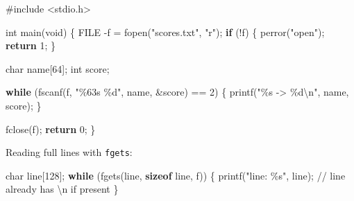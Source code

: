 \documentclass[
  letterpaper,
  DIV=11,
  numbers=noendperiod]{scrreprt}
\newenvironment{Shaded}{\begin{snugshade}}{\end{snugshade}}
\newcommand{\CommentTok}[1]{\textcolor[rgb]{0.37,0.37,0.37}{#1}}
\newcommand{\ControlFlowTok}[1]{\textcolor[rgb]{0.00,0.23,0.31}{\textbf{#1}}}
\newcommand{\DataTypeTok}[1]{\textcolor[rgb]{0.68,0.00,0.00}{#1}}
\newcommand{\DecValTok}[1]{\textcolor[rgb]{0.68,0.00,0.00}{#1}}
\newcommand{\ImportTok}[1]{\textcolor[rgb]{0.00,0.46,0.62}{#1}}
\newcommand{\KeywordTok}[1]{\textcolor[rgb]{0.00,0.23,0.31}{\textbf{#1}}}
\newcommand{\NormalTok}[1]{\textcolor[rgb]{0.00,0.23,0.31}{#1}}
\newcommand{\OperatorTok}[1]{\textcolor[rgb]{0.37,0.37,0.37}{#1}}
\newcommand{\PreprocessorTok}[1]{\textcolor[rgb]{0.68,0.00,0.00}{#1}}
\newcommand{\SpecialCharTok}[1]{\textcolor[rgb]{0.37,0.37,0.37}{#1}}
\newcommand{\StringTok}[1]{\textcolor[rgb]{0.13,0.47,0.30}{#1}}
\begin{document}
\begin{Shaded}
\begin{Highlighting}[]
\PreprocessorTok{\#include }\ImportTok{\textless{}stdio.h\textgreater{}}

\DataTypeTok{int}\NormalTok{ main}\OperatorTok{(}\DataTypeTok{void}\OperatorTok{)} \OperatorTok{\{}
    \DataTypeTok{FILE} \OperatorTok{{-}}\NormalTok{f }\OperatorTok{=}\NormalTok{ fopen}\OperatorTok{(}\StringTok{"scores.txt"}\OperatorTok{,} \StringTok{"r"}\OperatorTok{);}
    \ControlFlowTok{if} \OperatorTok{(!}\NormalTok{f}\OperatorTok{)} \OperatorTok{\{}\NormalTok{ perror}\OperatorTok{(}\StringTok{"open"}\OperatorTok{);} \ControlFlowTok{return} \DecValTok{1}\OperatorTok{;} \OperatorTok{\}}

    \DataTypeTok{char}\NormalTok{ name}\OperatorTok{[}\DecValTok{64}\OperatorTok{];}
    \DataTypeTok{int}\NormalTok{ score}\OperatorTok{;}

    \ControlFlowTok{while} \OperatorTok{(}\NormalTok{fscanf}\OperatorTok{(}\NormalTok{f}\OperatorTok{,} \StringTok{"}\SpecialCharTok{\%63s}\StringTok{ }\SpecialCharTok{\%d}\StringTok{"}\OperatorTok{,}\NormalTok{ name}\OperatorTok{,} \OperatorTok{\&}\NormalTok{score}\OperatorTok{)} \OperatorTok{==} \DecValTok{2}\OperatorTok{)} \OperatorTok{\{}
\NormalTok{        printf}\OperatorTok{(}\StringTok{"}\SpecialCharTok{\%s}\StringTok{ {-}\textgreater{} }\SpecialCharTok{\%d\textbackslash{}n}\StringTok{"}\OperatorTok{,}\NormalTok{ name}\OperatorTok{,}\NormalTok{ score}\OperatorTok{);}
    \OperatorTok{\}}

\NormalTok{    fclose}\OperatorTok{(}\NormalTok{f}\OperatorTok{);}
    \ControlFlowTok{return} \DecValTok{0}\OperatorTok{;}
\OperatorTok{\}}
\end{Highlighting}
\end{Shaded}

Reading full lines with \texttt{fgets}:

\begin{Shaded}
\begin{Highlighting}[]
\DataTypeTok{char}\NormalTok{ line}\OperatorTok{[}\DecValTok{128}\OperatorTok{];}
\ControlFlowTok{while} \OperatorTok{(}\NormalTok{fgets}\OperatorTok{(}\NormalTok{line}\OperatorTok{,} \KeywordTok{sizeof}\NormalTok{ line}\OperatorTok{,}\NormalTok{ f}\OperatorTok{))} \OperatorTok{\{}
\NormalTok{    printf}\OperatorTok{(}\StringTok{"line: }\SpecialCharTok{\%s}\StringTok{"}\OperatorTok{,}\NormalTok{ line}\OperatorTok{);}  \CommentTok{// line already has \textquotesingle{}\textbackslash{}n\textquotesingle{} if present}
\OperatorTok{\}}
\end{Highlighting}
\end{Shaded}
\end{document}

